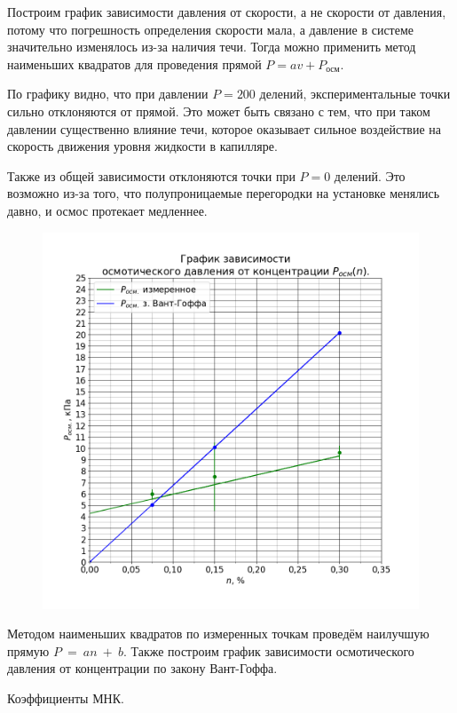 Построим график зависимости давления от скорости, а не скорости от давления, потому что погрешность определения скорости мала, а давление в системе значительно изменялось из-за наличия течи. Тогда можно применить метод наименьших квадратов для проведения прямой $P = av + P_{осм}$.



\newpage

По графику видно, что при давлении $P = 200$ делений, экспериментальные точки сильно отклоняются от прямой. Это может быть связано с тем, что при таком давлении существенно влияние течи, которое оказывает сильное воздействие на скорость движения уровня жидкости в капилляре.

Также из общей зависимости отклоняются точки при $P = 0$ делений. Это возможно из-за того, что полупроницаемые перегородки на установке менялись давно, и осмос протекает медленнее.

\newpage

\begin{figure}[H]
	\centering
	\includegraphics[width=1 \textwidth]{../plots/graph_p_osm_n.png}
\end{figure}

Методом наименьших квадратов по измеренных точкам проведём наилучшую прямую $P~=~an~+~b$. Также построим график зависимости осмотического давления от концентрации по закону Вант-Гоффа.

Коэффициенты МНК. \\



